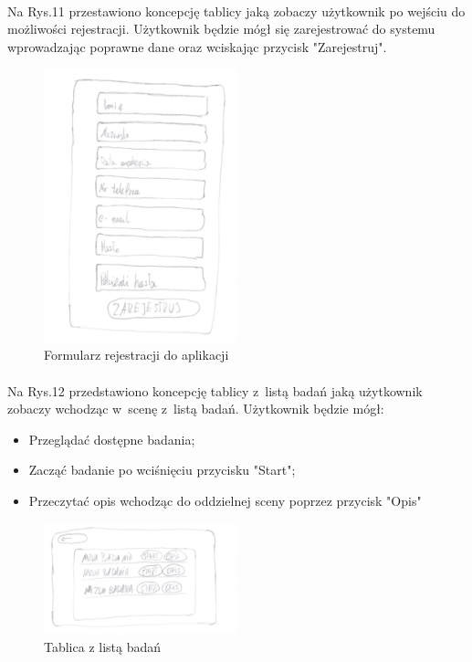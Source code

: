 \documentclass[12pt, letterpaper]{article}
\begin{document}
\newpage
	
\paragraph{}		
Na Rys.11 przestawiono koncepcję tablicy jaką zobaczy użytkownik po wejściu do możliwości rejestracji. Użytkownik będzie mógł się zarejestrować do systemu wprowadzając poprawne dane oraz wciskając przycisk "Zarejestruj".
		
\begin{figure}[h]
  \centering
      \includegraphics[width=0.5\textwidth]{GUI_rejestracja}
  \caption{Formularz rejestracji do aplikacji}
\end{figure}

\newpage
		
\paragraph{}
Na Rys.12 przedstawiono koncepcję tablicy z~listą badań jaką użytkownik zobaczy wchodząc w~scenę z~listą badań. Użytkownik będzie mógł:
		
		\begin{itemize}
			\item Przeglądać dostępne badania;
			\item Zacząć badanie po wciśnięciu przycisku "Start";
			\item Przeczytać opis wchodząc do oddzielnej sceny poprzez przycisk "Opis"
		\end{itemize}
		
\begin{figure}[h]
  \centering
      \includegraphics[width=0.5\textwidth]{GUI_lista_badan}
  \caption{Tablica z listą badań}
\end{figure}
\end{document}
